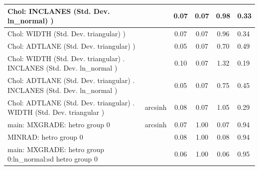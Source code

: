 \begin{table}
\begin{center}
\begin{tabular}{|l|l|c|c|c|l|}
			\hline
			 Chol: INCLANES (Std. Dev. ln_normal) ) &  & 0.07 & 0.07 & 0.98 & 0.33 \\
			\hline
			 Chol: WIDTH (Std. Dev. triangular) ) &  & 0.07 & 0.07 & 0.96 & 0.34 \\
			\hline
			 Chol: ADTLANE (Std. Dev. triangular) ) &  & 0.05 & 0.07 & 0.70 & 0.49 \\
			\hline
			 Chol: WIDTH (Std. Dev. triangular) . INCLANES (Std. Dev.   ln_normal ) &  & 0.10 & 0.07 & 1.32 & 0.19 \\
			\hline
			 Chol: ADTLANE (Std. Dev. triangular) . INCLANES (Std. Dev.   ln_normal ) &  & 0.05 & 0.07 & 0.75 & 0.45 \\
			\hline
			 Chol: ADTLANE (Std. Dev. triangular) . WIDTH (Std. Dev.   triangular ) & arcsinh & 0.08 & 0.07 & 1.05 & 0.29 \\
			\hline
			main: MXGRADE: hetro group 0 & arcsinh & 0.07 & 1.00 & 0.07 & 0.94 \\
			\hline
			MINRAD: hetro group 0 &  & 0.08 & 1.00 & 0.08 & 0.94 \\
			\hline
			main: MXGRADE: hetro group 0:ln_normal:sd  hetro group 0 &  & 0.06 & 1.00 & 0.06 & 0.95 \\
			\hline
		\end{tabular}
	\end{center}
\end{table}